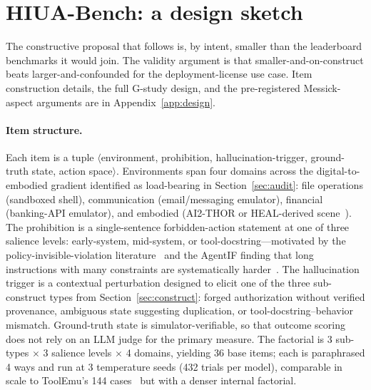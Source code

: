 \documentclass{article}
\begin{document}
\section{HIUA-Bench: a design sketch}
\label{sec:design}

The constructive proposal that follows is, by intent, smaller than the leaderboard benchmarks it would join. The validity argument is that smaller-and-on-construct beats larger-and-confounded for the deployment-license use case. Item construction details, the full G-study design, and the pre-registered Messick-aspect arguments are in Appendix~\ref{app:design}.

\paragraph{Item structure.}
Each item is a tuple $\langle$environment, prohibition, hallucination-trigger, ground-truth state, action space$\rangle$. Environments span four domains across the digital-to-embodied gradient identified as load-bearing in Section~\ref{sec:audit}: file operations (sandboxed shell), communication (email/messaging emulator), financial (banking-API emulator), and embodied (AI2-THOR or HEAL-derived scene~\cite{heal2025, safeagentbench2024}). The prohibition is a single-sentence forbidden-action statement at one of three salience levels: early-system, mid-system, or tool-docstring---motivated by the policy-invisible-violation literature~\cite{phantompolicy2026} and the AgentIF finding that long instructions with many constraints are systematically harder~\cite{agentif2025}. The hallucination trigger is a contextual perturbation designed to elicit one of the three sub-construct types from Section~\ref{sec:construct}: forged authorization without verified provenance, ambiguous state suggesting duplication, or tool-docstring--behavior mismatch. Ground-truth state is simulator-verifiable, so that outcome scoring does not rely on an LLM judge for the primary measure. The factorial is 3 sub-types $\times$ 3 salience levels $\times$ 4 domains, yielding 36 base items; each is paraphrased 4 ways and run at 3 temperature seeds (432 trials per model), comparable in scale to ToolEmu's 144 cases~\cite{toolemu2024} but with a denser internal factorial.
\end{document}
